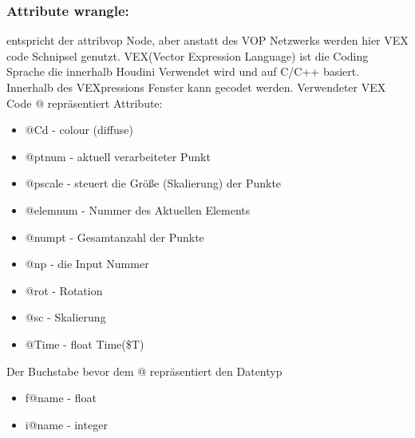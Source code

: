 \subsubsection*{​Attribute wrangle:}
entspricht der attribvop Node, aber anstatt des VOP Netzwerks werden hier VEX code Schnipsel genutzt. VEX(Vector Expression Language) ist die Coding Sprache die innerhalb Houdini Verwendet wird und auf C/C++ basiert.
Innerhalb des VEXpressions Fenster kann gecodet werden.
Verwendeter VEX Code
 @ repräsentiert Attribute:
\begin{itemize}
\item @Cd - colour (diffuse) 
\item @ptnum - aktuell verarbeiteter Punkt
\item @pscale - steuert die Größe (Skalierung) der Punkte
\item @elemnum - Nummer des Aktuellen Elements
\item @numpt - Gesamtanzahl der Punkte
\item @np - die Input Nummer
\item @rot - Rotation
\item @sc - Skalierung
\item @Time - float Time(\$T)
\end{itemize}

Der Buchstabe bevor dem @ repräsentiert den Datentyp 
\begin{itemize}
\item f@name - float
\item i@name - integer
\end{itemize}

